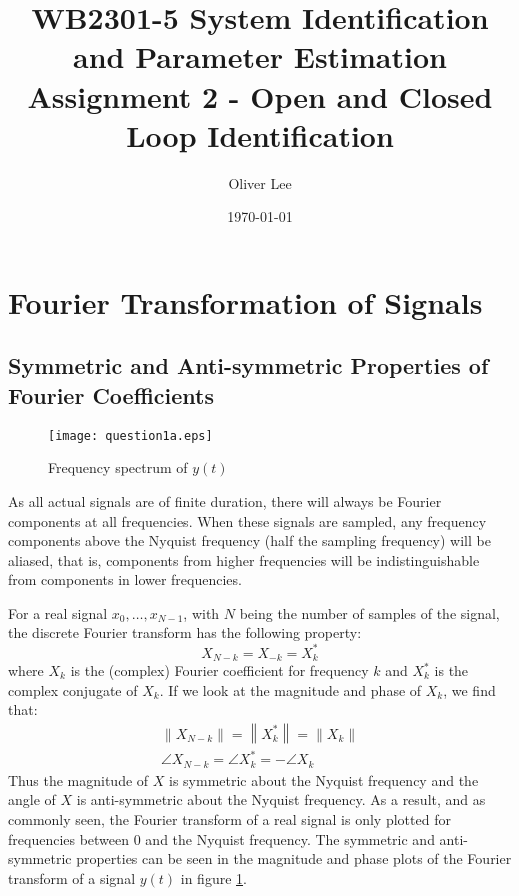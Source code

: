 \documentclass[11pt,a4paper]{article}
\title{WB2301-5 System Identification and Parameter Estimation \\
Assignment 2 - Open and Closed Loop Identification}
\author{Oliver Lee}
\date{\today}
\newcommand{\norm}[1]{\left\lVert#1\right\rVert}
\begin{document}
\maketitle

\section{Fourier Transformation of Signals}

\subsection{Symmetric and Anti-symmetric Properties of Fourier Coefficients}
\begin{figure}
    \begin{center}
        \texttt{[image: question1a.eps]}
    \end{center}
    \caption{Frequency spectrum of $y(t)$}
    \label{fig:1a}
\end{figure}
As all actual signals are of finite duration, there will always be Fourier
components at all frequencies. When these signals are sampled, any frequency
components above the Nyquist frequency (half the sampling frequency) will be
aliased, that is, components from higher frequencies will be indistinguishable
from components in lower frequencies.

For a real signal $x_0, \ldots, x_{N-1}$, with $N$ being the number of samples
of the signal, the discrete Fourier transform has the following property:
\begin{equation*}
    X_{N-k} = X_{-k} = X_{k}^{*}
\end{equation*}
where $X_{k}$ is the (complex) Fourier coefficient for frequency $k$ and
$X_{k}^{*}$ is the complex conjugate of $X_k$. If we look at the magnitude and
phase of $X_k$, we find that:
\begin{align*}
    \norm{X_{N-k}} = \norm{X_{k}^{*}} = \norm{X_{k}} \\
    \angle X_{N-k} = \angle X_{k}^{*}  = -\angle X_{k}
\end{align*}
Thus the magnitude of $X$ is symmetric about the Nyquist frequency and the
angle of $X$ is anti-symmetric about the Nyquist frequency. As a result, and as
commonly seen, the Fourier transform of a real signal is only plotted for
frequencies between 0 and the Nyquist frequency. The symmetric and
anti-symmetric properties can be seen in the magnitude and phase plots of the
Fourier transform of a signal $y(t)$ in figure \ref{fig:1a}.
\end{document}
